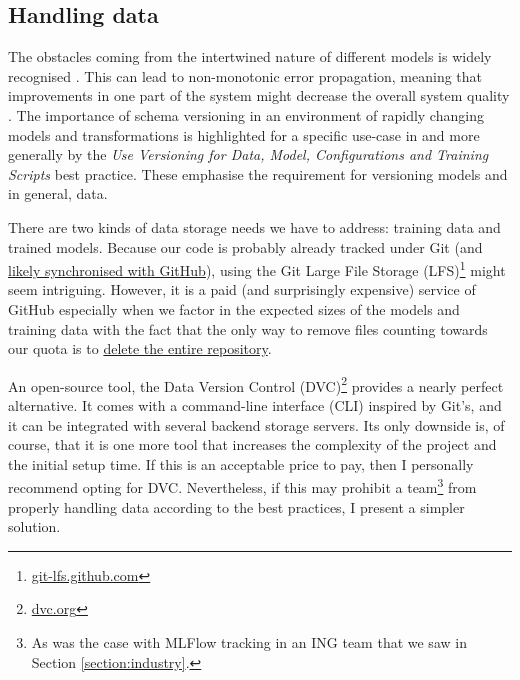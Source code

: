 \subsection{Handling data} \label{subsection:large-file}

The obstacles coming from the intertwined nature of different models is widely recognised \cite{haakman2021ai,amershi2019software,sculley2015hidden}. This can lead to non-monotonic error propagation, meaning that improvements in one part of the system might decrease the overall system quality \cite{amershi2019software}. The importance of schema versioning in an environment of rapidly changing models and transformations is highlighted for a specific use-case in \cite{van2017versioning} and more generally by the \textit{Use Versioning for Data, Model, Configurations and Training Scripts} best practice. These emphasise the requirement for versioning models and in general, data.

There are two kinds of data storage needs we have to address: training data and trained models. Because our code is probably already tracked under Git (and \href{https://octoverse.github.com/#lets-look-back-at-the-code-and-communities-built-on-git-hub-this-year}{likely synchronised with GitHub}), using the Git Large File Storage (LFS)\footnote{\href{https://git-lfs.github.com/}{git-lfs.github.com}} might seem intriguing. However, it is a paid (and surprisingly expensive) service of GitHub especially when we factor in the expected sizes of the models and training data with the fact that the only way to remove files counting towards our quota is to \href{https://docs.github.com/en/repositories/working-with-files/managing-large-files/removing-files-from-git-large-file-storage#git-lfs-objects-in-your-repository}{delete the entire repository}.

An open-source tool, the Data Version Control (DVC)\footnote{\href{https://dvc.org/}{dvc.org}} provides a nearly perfect alternative. It comes with a command-line interface (CLI) inspired by Git's, and it can be integrated with several backend storage servers. Its only downside is, of course, that it is one more tool that increases the complexity of the project and the initial setup time. If this is an acceptable price to pay, then I personally recommend opting for DVC. Nevertheless, if this may prohibit a team\footnote{As was the case with MLFlow tracking in an ING team that we saw in Section \ref{section:industry}.} from properly handling data according to the best practices, I present a simpler solution.

